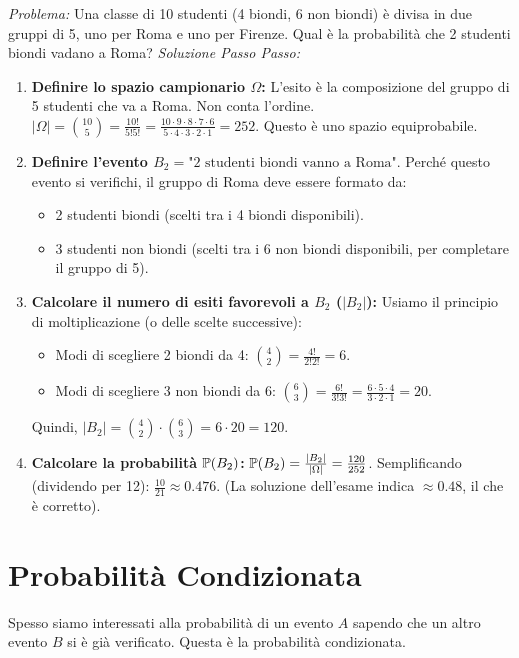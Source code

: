 \documentclass[12pt,a4paper]{article}
\begin{document}
\begin{example}
\textit{Problema:} Una classe di 10 studenti (4 biondi, 6 non biondi) è divisa in due gruppi di 5, uno per Roma e uno per Firenze. Qual è la probabilità che 2 studenti biondi vadano a Roma?
\textit{Soluzione Passo Passo:}
\begin{enumerate}
    \item \textbf{Definire lo spazio campionario $\Omega$:} L'esito è la composizione del gruppo di 5 studenti che va a Roma. Non conta l'ordine.
    $|\Omega| = \binom{10}{5} = \frac{10!}{5!5!} = \frac{10 \cdot 9 \cdot 8 \cdot 7 \cdot 6}{5 \cdot 4 \cdot 3 \cdot 2 \cdot 1} = 252$.
    Questo è uno spazio equiprobabile.
    \item \textbf{Definire l'evento $B_2 = \text{"2 studenti biondi vanno a Roma"}$}.
    Perché questo evento si verifichi, il gruppo di Roma deve essere formato da:
    \begin{itemize}
        \item 2 studenti biondi (scelti tra i 4 biondi disponibili).
        \item 3 studenti non biondi (scelti tra i 6 non biondi disponibili, per completare il gruppo di 5).
    \end{itemize}
    \item \textbf{Calcolare il numero di esiti favorevoli a $B_2$ ($|B_2|$):}
    Usiamo il principio di moltiplicazione (o delle scelte successive):
    \begin{itemize}
        \item Modi di scegliere 2 biondi da 4: $\binom{4}{2} = \frac{4!}{2!2!} = 6$.
        \item Modi di scegliere 3 non biondi da 6: $\binom{6}{3} = \frac{6!}{3!3!} = \frac{6 \cdot 5 \cdot 4}{3 \cdot 2 \cdot 1} = 20$.
    \end{itemize}
    Quindi, $|B_2| = \binom{4}{2} \cdot \binom{6}{3} = 6 \cdot 20 = 120$.
    \item \textbf{Calcolare la probabilità $\mathbb{P}(B_2)$:}
    $\mathbb{P}(B_2) = \frac{|B_2|}{|\Omega|} = \frac{120}{252}$.
    Semplificando (dividendo per 12): $\frac{10}{21} \approx 0.476$. (La soluzione dell'esame indica $\approx 0.48$, il che è corretto).
\end{enumerate}
\end{example}

\section{Probabilità Condizionata}
\label{sec:prob_cond}
Spesso siamo interessati alla probabilità di un evento $A$ sapendo che un altro evento $B$ si è già verificato. Questa è la probabilità condizionata.
\end{document}
